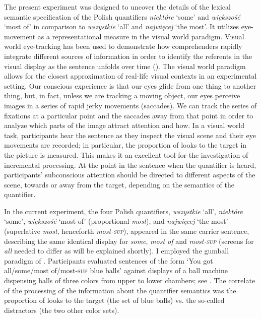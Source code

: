 \documentclass[output=paper]{langscibook}
\begin{document}
The present experiment was designed to uncover the details of the lexical semantic specification of the Polish
quantifiers \textit{niektóre} `some' and \textit{większość} `most of' in comparison to
\textit{wszystkie} `all' and \textit{najwięcej} `the most'. It utilizes eye-movement as a
representational measure in the visual world paradigm. Visual world eye-tracking has been used to demonstrate how
comprehenders rapidly integrate different sources of information in order to identify the referents in the visual
display as the sentence unfolds over time (\citealt{tanenhaus1995integration, allopenna1998tracking}). The visual world
paradigm allows for the closest approximation of real-life visual contexts in an experimental setting. Our conscious
experience is that our eyes glide from one thing to another thing, but, in fact, unless we are tracking a moving object, our eyes
perceive images in a series of rapid jerky movements (saccades). We can track the series of fixations at a particular
point and the saccades away from that point in order to analyze which parts of the image attract attention and how. In
a visual world task, participants hear the sentence as they inspect the visual scene and their eye movements are
recorded; in particular, the proportion of looks to the target in the picture is measured. This makes it an excellent
tool for the investigation of incremental processing. At the point in the sentence when the quantifier is heard,
participants’ subconscious attention should be directed to different aspects of the scene, towards or away from the
target, depending on the semantics of the quantifier.

In the current experiment, the four Polish quantifiers, \textit{wszystkie} `all', \textit{niektóre} `some', \textit{większość} `most of' (proportional \textit{most}), and \textit{najwięcej} `the most' (superlative \textit{most}, henceforth \textit{most\textsc{-sup}}), appeared in the same carrier
sentence, describing the same identical display for \textit{some}, \textit{most of} and \textit{most\textsc{-sup}} (screens for \textit{all} needed to differ as will be explained shortly). I employed the gumball paradigm of \citet{degen2011making,degen2016availability}. Participants evaluated sentences of the form ‘You got all/some/most
of/most\textsc{-sup} blue balls’ against displays of a ball machine dispensing balls of three colors from upper to lower chambers; see . The correlate of the processing of the information about the quantifier semantics was the proportion of looks to the target (the set of blue balls) vs. the so-called distractors (the two other color sets).
\end{document}
